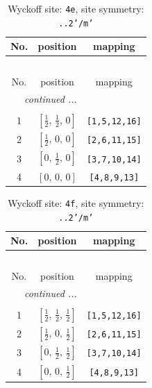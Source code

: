 \documentclass[fleqn,8pt]{jsarticle}
\begin{document}
\begin{longtable}{ccc}
\caption{Wyckoff site: {\tt 4e}, site symmetry: {\tt ..2'/m'}}
 \\
 \hline \hline
No. & position & mapping \\ \hline \endfirsthead

\multicolumn{2}{l}{\tablename\ \thetable{}} \\
 \hline \hline
No. & position & mapping \\ \hline \endhead

 \hline \hline
\multicolumn{2}{r}{\footnotesize\it continued ...} \\ \endfoot

 \hline \hline
\multicolumn{2}{r}{} \\ \endlastfoot

1 & $\left[ \frac{1}{2},\, \frac{1}{2},\, 0 \right]$ & {\tt [1,5,12,16]} \\ \hline
2 & $\left[ \frac{1}{2},\, 0,\, 0 \right]$ & {\tt [2,6,11,15]} \\ \hline
3 & $\left[ 0,\, \frac{1}{2},\, 0 \right]$ & {\tt [3,7,10,14]} \\ \hline
4 & $\left[ 0,\, 0,\, 0 \right]$ & {\tt [4,8,9,13]} \\
\end{longtable}
\renewcommand{\arraystretch}{1.2}
\begin{longtable}{ccc}
\caption{Wyckoff site: {\tt 4f}, site symmetry: {\tt ..2'/m'}}
 \\
 \hline \hline
No. & position & mapping \\ \hline \endfirsthead

\multicolumn{2}{l}{\tablename\ \thetable{}} \\
 \hline \hline
No. & position & mapping \\ \hline \endhead

 \hline \hline
\multicolumn{2}{r}{\footnotesize\it continued ...} \\ \endfoot

 \hline \hline
\multicolumn{2}{r}{} \\ \endlastfoot

1 & $\left[ \frac{1}{2},\, \frac{1}{2},\, \frac{1}{2} \right]$ & {\tt [1,5,12,16]} \\ \hline
2 & $\left[ \frac{1}{2},\, 0,\, \frac{1}{2} \right]$ & {\tt [2,6,11,15]} \\ \hline
3 & $\left[ 0,\, \frac{1}{2},\, \frac{1}{2} \right]$ & {\tt [3,7,10,14]} \\ \hline
4 & $\left[ 0,\, 0,\, \frac{1}{2} \right]$ & {\tt [4,8,9,13]} \\
\end{longtable}
\end{document}
